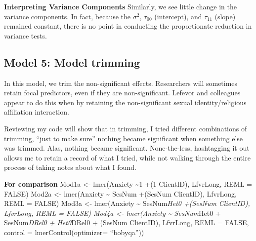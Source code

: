 \documentclass[
  11pt,
]{book}
\begin{document}
\textbf{Interpreting Variance Components}
Similarly, we see little change in the variance components. In fact, because the \(\sigma ^{2}\), \(\tau _{00}\) (intercept), and \(\tau _{11}\) (slope) remained constant, there is no point in conducting the proportionate reduction in variance tests.

\hypertarget{model-5-model-trimming}{%
\subsection{Model 5: Model trimming}\label{model-5-model-trimming}}

In this model, we trim the non-significant effects. Researchers will sometimes retain focal predictors, even if they are non-significant. Lefevor and colleagues \citep{lefevor_religious_2017} appear to do this when by retaining the non-significant sexual identity/religious affiliation interaction.

Reviewing my code will show that in trimming, I tried different combinations of trimming, ``just to make sure'' nothing became significant when something else was trimmed. Alas, nothing became significant. None-the-less, hashtagging it out allows me to retain a record of what I tried, while not walking through the entire process of taking notes about what I found.

\textbf{For comparison}
Mod1a \textless- lmer(Anxiety \textasciitilde1 +(1 \textbar{} ClientID), LfvrLong, REML = FALSE)
Mod2a \textless- lmer(Anxiety \textasciitilde{} SesNum +(SesNum \textbar{} ClientID), LfvrLong, REML = FALSE)
Mod3a \textless- lmer(Anxiety \textasciitilde{} SesNum\emph{Het0 +(SesNum \textbar{} ClientID), LfvrLong, REML = FALSE)
Mod4a \textless- lmer(Anxiety \textasciitilde{} SesNum}Het0 + SesNum\emph{DRel0 + Het0}DRel0 + (SesNum \textbar{} ClientID), LfvrLong, REML = FALSE, control = lmerControl(optimizer= ``bobyqa''))
\end{document}
